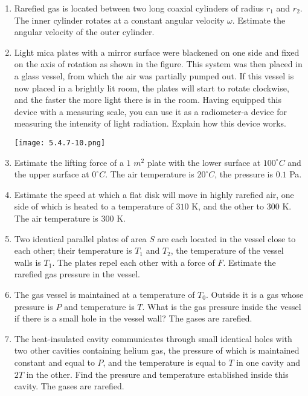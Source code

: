 \documentclass{article}
\begin{document}
\begin{enumerate}[label=5.4.\arabic*]
\item Rarefied gas is located between two long coaxial cylinders of radius $r_1$ and $r_2$. The inner cylinder rotates at a constant angular velocity $\omega$. Estimate the angular velocity of the outer cylinder.

\item Light mica plates with a mirror surface were blackened on one side and fixed on the axis of rotation as shown in the figure. This system was then placed in a glass vessel, from which the air was partially pumped out. If this vessel is now placed in a brightly lit room, the plates will start to rotate clockwise, and the faster the more light there is in the room. Having equipped this device with a measuring scale, you can use it as a radiometer-a device for measuring the intensity of light radiation. Explain how this device works.

\begin{center}
    \texttt{[image: 5.4.7-10.png]}
\end{center}



\item Estimate the lifting force of a $1$ $m^2$ plate with the lower surface at $100^\circ C$ and the upper surface at $0^\circ C$. The air temperature is $20^\circ C$, the pressure is $0.1$ Pa.

\item Estimate the speed at which a flat disk will move in highly rarefied air, one side of which is heated to a temperature of $310$ K, and the other to $300$ K. The air temperature is $300$ K.

\item Two identical parallel plates of area $S$ are each located in the vessel close to each other; their temperature is $T_1$ and $T_2$, the temperature of the vessel walls is $T_1$. The plates repel each other with a force of $F$. Estimate the rarefied gas pressure in the vessel.

\item The gas vessel is maintained at a temperature of $T_0$. Outside it is a gas whose pressure is $P$ and temperature is $T$. What is the gas pressure inside the vessel if there is a small hole in the vessel wall? The gases are rarefied.

\item The heat-insulated cavity communicates through small identical holes with two other cavities containing helium gas, the pressure of which is maintained constant and equal to $P$, and the temperature is equal to $T$ in one cavity and $2T$ in the other. Find the pressure and temperature established inside this cavity. The gases are rarefied.


\end{enumerate}
\end{document}
